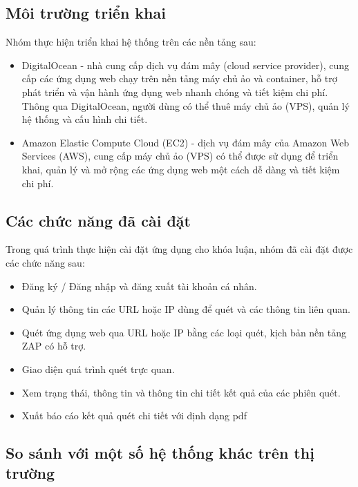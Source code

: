 \subsection{Môi trường triển khai}

\tab Nhóm thực hiện triển khai hệ thống trên các nền tảng sau:

\begin{itemize}
    \item DigitalOcean - nhà cung cấp dịch vụ đám mây (cloud service provider), cung cấp các ứng dụng web chạy trên nền tảng máy chủ ảo và container, hỗ trợ phát triển và vận hành ứng dụng web nhanh chóng và tiết kiệm chi phí. Thông qua DigitalOcean, người dùng có thể thuê máy chủ ảo (VPS), quản lý hệ thống và cấu hình chi tiết.
    \item Amazon Elastic Compute Cloud (EC2) - dịch vụ đám mây của Amazon Web Services (AWS), cung cấp máy chủ ảo (VPS) có thể được sử dụng để triển khai, quản lý và mở rộng các ứng dụng web một cách dễ dàng và tiết kiệm chi phí.
\end{itemize}

\subsection{Các chức năng đã cài đặt}

\tab Trong quá trình thực hiện cài đặt ứng dụng cho khóa luận, nhóm đã cài đặt được các chức năng sau:

\begin{itemize}
    \item Đăng ký / Đăng nhập và đăng xuất tài khoản cá nhân.
    \item Quản lý thông tin các URL hoặc IP dùng để quét và các thông tin liên quan.
    \item Quét ứng dụng web qua URL hoặc IP bằng các loại quét, kịch bản nền tảng ZAP có hỗ trợ.
    \item Giao diện quá trình quét trực quan.
    \item Xem trạng thái, thông tin và thông tin chi tiết kết quả của các phiên quét.
    \item Xuất báo cáo kết quả quét chi tiết với định dạng pdf
\end{itemize}

\subsection{So sánh với một số hệ thống khác trên thị trường}

